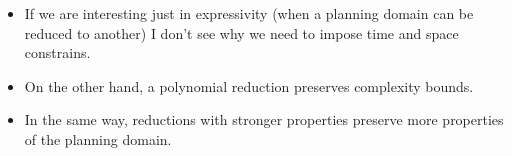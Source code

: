 \begin{itemize}

\item If we are interesting just in expressivity (when a planning domain can be reduced 
to another) I don't see why we need to impose time and space constrains. 

\item On the other hand, a polynomial reduction preserves complexity bounds. 

\item In the same way, reductions with stronger properties preserve more properties of the planning domain. 

\end{itemize}




